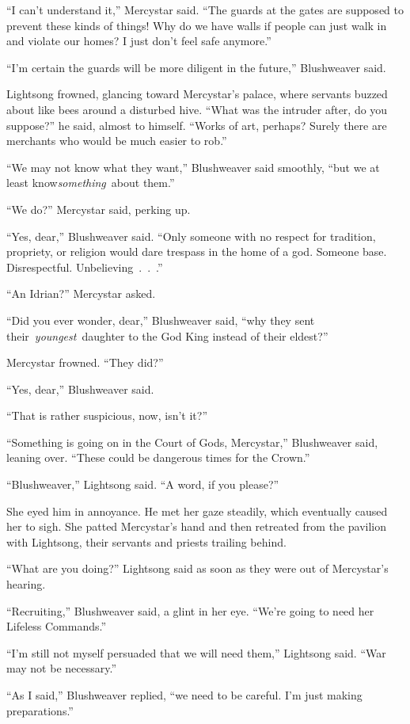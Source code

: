“I can’t understand it,” Mercystar said. “The guards at the gates are supposed to prevent these kinds of things! Why do we have walls if people can just walk in and violate our homes? I just don’t feel safe anymore.”

“I’m certain the guards will be more diligent in the future,” Blushweaver said.

Lightsong frowned, glancing toward Mercystar’s palace, where servants buzzed about like bees around a disturbed hive. “What was the intruder after, do you suppose?” he said, almost to himself. “Works of art, perhaps? Surely there are merchants who would be much easier to rob.”

“We may not know what they want,” Blushweaver said smoothly, “but we at least know\textit{something}~about them.”

“We do?” Mercystar said, perking up.

“Yes, dear,” Blushweaver said. “Only someone with no respect for tradition, propriety, or religion would dare trespass in the home of a god. Someone base. Disrespectful. Unbelieving~.~.~.”

“An Idrian?” Mercystar asked.

“Did you ever wonder, dear,” Blushweaver said, “why they sent their~\textit{youngest}~daughter to the God King instead of their eldest?”

Mercystar frowned. “They did?”

“Yes, dear,” Blushweaver said.

“That is rather suspicious, now, isn’t it?”

“Something is going on in the Court of Gods, Mercystar,” Blushweaver said, leaning over. “These could be dangerous times for the Crown.”

“Blushweaver,” Lightsong said. “A word, if you please?”

She eyed him in annoyance. He met her gaze steadily, which eventually caused her to sigh. She patted Mercystar’s hand and then retreated from the pavilion with Lightsong, their servants and priests trailing behind.

“What are you doing?” Lightsong said as soon as they were out of Mercystar’s hearing.

“Recruiting,” Blushweaver said, a glint in her eye. “We’re going to need her Lifeless Commands.”

“I’m still not myself persuaded that we will need them,” Lightsong said. “War may not be necessary.”

“As I said,” Blushweaver replied, “we need to be careful. I’m just making preparations.”

